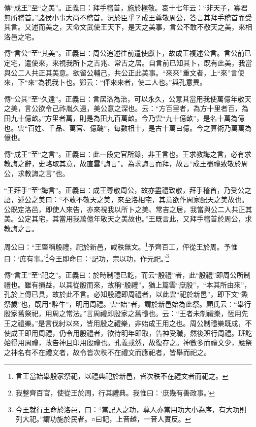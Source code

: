 {\noindent\zhuan{}\fzbyks 傳“成王”至“之美”。正義曰：拜手稽首，施於極敬。哀十七年云：“非天子，寡君無所稽首。”諸侯小事大尚不稽首，況於臣乎？成王尊敬周公，答言其拜手稽首而受其言。又述而美之，天命文武使王天下，是天之美事，言公不敢不敬天之美，來相洛邑之宅。 \par}

{\noindent\zhuan{}\fzbyks 傳“言公”至“其美”。正義曰：周公追述往前遣使獻卜，故成王複述公言。言公前已定宅，遣使來，來視我所卜之吉兆、常吉之居。自言前已知其卜，既有此美，我當與公二人共正其美意。欲留公輔己，共公正此美事。“來來”重文者，上“來”言使來，下“來”為視我卜也。鄭云：“伻來來者，使二人也。”與孔意異。 \par}

{\noindent\zhuan{}\fzbyks 傳“公其”至“久遠”。正義曰：言居洛為治，可以永久，公意其當用我使萬億年敬天之美，言公欲令己祚胤久遠，美公意之深也。云：“方百里者，為方十里者百，為田九十億畝。”方里者萬，則是為田九百萬畝。今乃雲“九十億畝”，是名十萬為億也。雲“百姓、千品、萬官、億醜”，每數相十，是古十萬曰億。今之算術乃萬萬為億也。 \par}

{\noindent\zhuan{}\fzbyks 傳“成王”至“之言”。正義曰：此一段史官所錄，非王言也。王求教誨之言，必有求教誨之辭，史略取其意，故直雲“誨言”。為求誨言而拜，故言“成王盡禮致敬於周公，求教誨之言”也。 \par}

{\noindent\shu{}\fzkt “王拜手”至“誨言”。正義曰：成王尊敬周公，故亦盡禮致敬，拜手稽首，乃受公之語，述公之美曰：“不敢不敬天之美，來至洛相宅，其意欲作周家配天之美故也。公既定洛邑，即使人來告，亦來視我以所卜之美、常吉之居，我當與公二人共正其美。公定其宅，其當用我萬億年敬天之美故也。”王既言此，又拜手稽首於周公，求教誨之言。 \par}

周公曰：“王肇稱殷禮，祀於新邑，咸秩無文。\footnote{言王當始舉殷家祭祀，以禮典祀於新邑，皆次秩不在禮文者而祀之。}予齊百工，伻從王於周。予惟曰：‘庶有事。’\footnote{我整齊百官，使從王於周，行其禮典。我惟曰：‘庶幾有善政事。’}今王即命曰：‘記功，宗以功，作元祀。’\footnote{今王就行王命於洛邑，曰：“當記人之功，尊人亦當用功大小為序，有大功則列大祀。”謂功施於民者。○曰記，上音越，一音人實反。}


{\noindent\zhuan{}\fzbyks 傳“言王”至“祀之”。正義曰：於時制禮已訖，而云“殷禮”者，此“殷禮”即周公所制禮也。雖有損益，以其從殷而來，故稱“殷禮”。猶上篇雲“庶殷”，“本其所由來”，孔於上傳已具，故於此不言。必知殷禮即周禮者，以此雲“祀於新邑”，即下文“烝祭歲”也，既用“騂牛”，明用周禮。雲“始”者，謂於新邑始為此祭。顧氏云：“舉行殷家舊祭祀，用周之常法。”言周禮即殷家之舊禮也。云：“王者未制禮樂，恆用先王之禮樂。”是言伐紂以來，皆用殷之禮樂，非始成王用之也。周公制禮樂既成，不使成王即用周禮，仍令用殷禮者，欲待明年即取，告神受職，然後班行周禮。班訖始得用周禮，故告神且印用殷禮也。孔義或然，故復存之。神數多而禮文少，應祭之神名有不在禮文者，故令皆次秩不在禮文而應祀者，皆舉而祀之。 \par}

